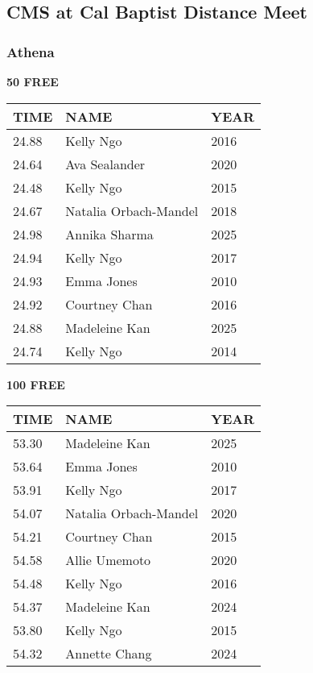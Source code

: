 
\newpage

\subsection{CMS at Cal Baptist Distance Meet}
\subsubsection{Athena}

\begin{table}[H]
\centering
\begin{minipage}[t]{0.48\textwidth}
\centering
\textbf{50 FREE}\\[0.1cm]
\begin{tabular}{@{}p{1.8cm}p{2.8cm}p{1.2cm}@{}}
\hline
    \textbf{TIME} & \textbf{NAME} & \textbf{YEAR} \\
\hline
    24.88 & Kelly Ngo & 2016 \\
    24.64 & Ava Sealander & 2020 \\
    24.48 & Kelly Ngo & 2015 \\
    24.67 & Natalia Orbach-Mandel & 2018 \\
    24.98 & Annika Sharma & 2025 \\
    24.94 & Kelly Ngo & 2017 \\
    24.93 & Emma Jones & 2010 \\
    24.92 & Courtney Chan & 2016 \\
    24.88 & Madeleine Kan & 2025 \\
    24.74 & Kelly Ngo & 2014 \\
\hline
\end{tabular}
\end{minipage}\hfill
\begin{minipage}[t]{0.48\textwidth}
\centering
\textbf{100 FREE}\\[0.1cm]
\begin{tabular}{@{}p{1.8cm}p{2.8cm}p{1.2cm}@{}}
\hline
    \textbf{TIME} & \textbf{NAME} & \textbf{YEAR} \\
\hline
    53.30 & Madeleine Kan & 2025 \\
    53.64 & Emma Jones & 2010 \\
    53.91 & Kelly Ngo & 2017 \\
    54.07 & Natalia Orbach-Mandel & 2020 \\
    54.21 & Courtney Chan & 2015 \\
    54.58 & Allie Umemoto & 2020 \\
    54.48 & Kelly Ngo & 2016 \\
    54.37 & Madeleine Kan & 2024 \\
    53.80 & Kelly Ngo & 2015 \\
    54.32 & Annette Chang & 2024 \\
\hline
\end{tabular}
\end{minipage}
\end{table}

